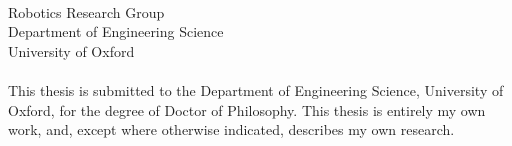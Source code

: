 \begin{titlepage}
\begin{center}
\vspace*{1.0cm}
\Huge
{\bf \xtitle}\\
\vspace*{2.5cm}
{\Large \bf
\xauthor\\
\xcollege\\
}
\vspace*{2.5cm}
\centerline{
}
\vspace*{1.5cm}
\normalsize
Robotics Research Group\\
Department of Engineering Science\\
University of Oxford\\[0.5cm]
{\bf \xterm}\\

\vspace{2cm}
This thesis is submitted to the Department of Engineering Science,
University of Oxford, for the degree of Doctor of Philosophy. This
thesis is entirely my own work, and, except where otherwise indicated,
describes my own research.
\end{center}
\end{titlepage}

